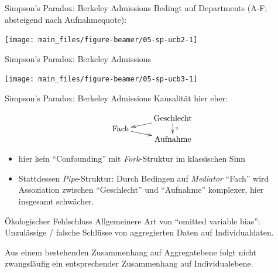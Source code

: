 \documentclass[
  10pt,
  ignorenonframetext,
]{beamer}
\providecommand{\tightlist}{%
  \setlength{\itemsep}{0pt}\setlength{\parskip}{0pt}}
\begin{document}
\begin{frame}{Simpson's Paradox: Berkeley Admissions}
\label{simpsons-paradox-berkeley-admissions-1}
Bedingt auf Departments (A-F; absteigend nach Aufnahmequote):

\scriptsize

\begin{center}\texttt{[image: main\_files/figure-beamer/05-sp-ucb2-1]} \end{center}

\normalsize
\end{frame}

\begin{frame}{Simpson's Paradox: Berkeley Admissions}
\label{simpsons-paradox-berkeley-admissions-2}
\scriptsize

\begin{center}\texttt{[image: main\_files/figure-beamer/05-sp-ucb3-1]} \end{center}

\normalsize
\end{frame}

\begin{frame}{Simpson's Paradox: Berkeley Admissions}
\label{simpsons-paradox-berkeley-admissions-3}
Kausalität hier eher:

\[\xymatrix@R-2pc{
                         &  \text{Geschlecht}\ar[dl]\ar[dd]^?\\
        \text{Fach} \ar[dr] &  \\
                         & \text{Aufnahme}}\]

\begin{itemize}
\tightlist
\item
  hier kein ``Confounding'' mit \emph{Fork}-Struktur im klassischen Sinn
\item
  Stattdessen \emph{Pipe}-Struktur: Durch Bedingen auf \emph{Mediator}
  ``Fach'' wird Assoziation zwischen ``Geschlecht'' und ``Aufnahme''
  komplexer, hier insgesamt schwächer.
\end{itemize}
\end{frame}

\begin{frame}{Ökologischer Fehlschluss}
\label{uxf6kologischer-fehlschluss}
Allgemeinere Art von ``omitted variable bias'':\\
Unzulässige / falsche Schlüsse von aggregierten Daten auf
Individualdaten.

Aus einem bestehenden Zusammenhang auf Aggregatebene folgt nicht
zwangsläufig ein entsprechender Zusammenhang auf Individualebene.
\end{frame}
\end{document}
